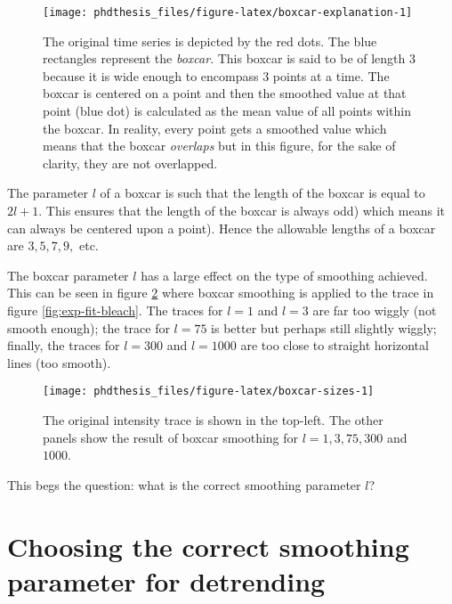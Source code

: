 \documentclass[12pt,]{book}
\theoremstyle{definition}
\theoremstyle{definition}
\theoremstyle{definition}
\theoremstyle{remark}
\begin{document}
\begin{figure}

\texttt{[image: phdthesis\_files/figure-latex/boxcar-explanation-1]} \hfill{}

\caption{The original time series is depicted by
the red dots. The blue rectangles represent the \emph{boxcar}. This
boxcar is said to be of length 3 because it is wide enough to encompass
3 points at a time. The boxcar is centered on a point and then the
smoothed value at that point (blue dot) is calculated as the mean value
of all points within the boxcar. In reality, every point gets a smoothed
value which means that the boxcar \emph{overlaps} but in this figure,
for the sake of clarity, they are not overlapped.}\label{fig:boxcar-explanation}
\end{figure}

The parameter \(l\) of a boxcar is such that the length of the boxcar is
equal to \(2l + 1\). This ensures that the length of the boxcar is
always odd) which means it can always be centered upon a point). Hence
the allowable lengths of a boxcar are \(3,5,7,9,\) etc.

The boxcar parameter \(l\) has a large effect on the type of smoothing
achieved. This can be seen in figure \ref{fig:boxcar-sizes} where boxcar
smoothing is applied to the trace in figure \ref{fig:exp-fit-bleach}.
The traces for \(l=1\) and \(l=3\) are far too wiggly (not smooth
enough); the trace for \(l=75\) is better but perhaps still slightly
wiggly; finally, the traces for \(l=300\) and \(l=1000\) are too close
to straight horizontal lines (too smooth).





\begin{figure}

\texttt{[image: phdthesis\_files/figure-latex/boxcar-sizes-1]} \hfill{}

\caption{The original intensity trace is shown in the
top-left. The other panels show the result of boxcar smoothing for
\(l = 1, 3, 75, 300\) and \(1000\).}\label{fig:boxcar-sizes}
\end{figure}

This begs the question: what is the correct smoothing parameter \(l\)?

\section{Choosing the correct smoothing parameter for
detrending}\label{choosing-the-correct-smoothing-parameter-for-detrending}
\end{document}

